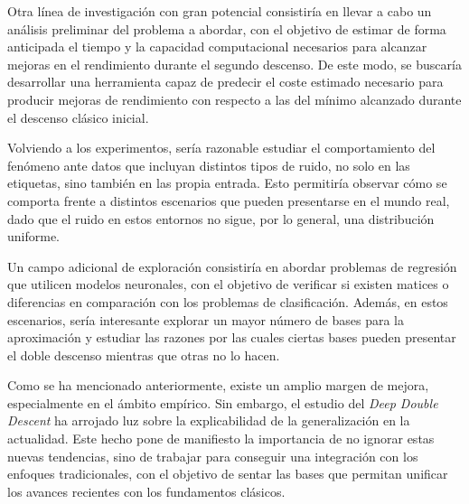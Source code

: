 Otra línea de investigación con gran potencial consistiría en llevar a cabo un análisis preliminar del problema a abordar, con el objetivo de estimar de forma anticipada el tiempo y la capacidad computacional necesarios para alcanzar mejoras en el rendimiento durante el segundo descenso. De este modo, se buscaría desarrollar una herramienta capaz de predecir el coste estimado necesario para producir mejoras de rendimiento con respecto a las del mínimo alcanzado durante el descenso clásico inicial. 

Volviendo a los experimentos, sería razonable estudiar el comportamiento del fenómeno ante datos que incluyan distintos tipos de ruido, no solo en las etiquetas, sino también en las propia entrada. Esto permitiría observar cómo se comporta frente a distintos escenarios que pueden presentarse en el mundo real, dado que el ruido en estos entornos no sigue, por lo general, una distribución uniforme.

Un campo adicional de exploración consistiría en abordar problemas de regresión que utilicen modelos neuronales, con el objetivo de verificar si existen matices o diferencias en comparación con los problemas de clasificación. Además, en estos escenarios, sería interesante explorar un mayor número de bases para la aproximación y estudiar las razones por las cuales ciertas bases pueden presentar el doble descenso mientras que otras no lo hacen.

Como se ha mencionado anteriormente, existe un amplio margen de mejora, especialmente en el ámbito empírico. Sin embargo, el estudio del \textit{Deep Double Descent} ha arrojado luz sobre la explicabilidad de la generalización en la actualidad. Este hecho pone de manifiesto la importancia de no ignorar estas nuevas tendencias, sino de trabajar para conseguir una integración con los enfoques tradicionales, con el objetivo de sentar las bases que permitan unificar los avances recientes con los fundamentos clásicos.

\endinput